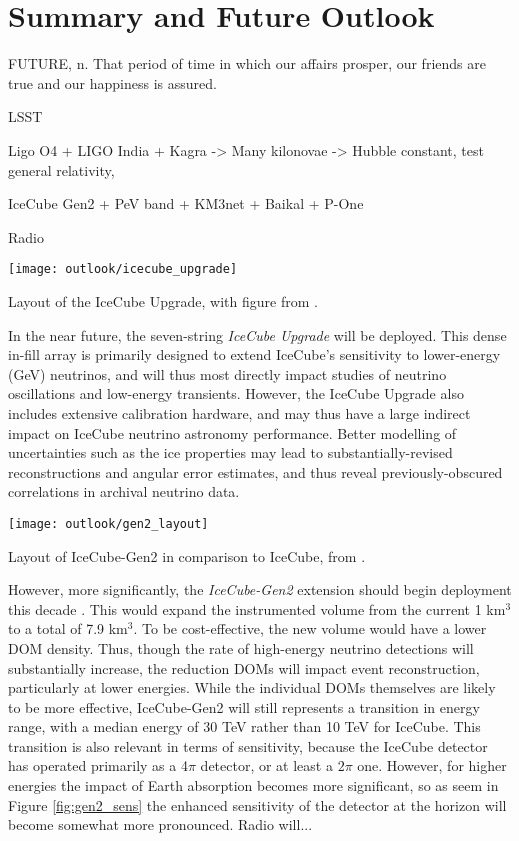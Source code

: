 \setchapterpreamble[u]{\margintoc}
\chapter{Summary and Future Outlook}
\begin{fquote} FUTURE, n. That period of time in which our affairs prosper, our friends are true and our happiness is assured.  
\end{fquote}

LSST

Ligo O4 + LIGO India + Kagra -> Many kilonovae -> Hubble constant, test general relativity, 

IceCube Gen2 + PeV band + KM3net + Baikal + P-One

Radio


\begin{marginfigure}
	\centering \texttt{[image: outlook/icecube\_upgrade]}
	\caption{Layout of the IceCube Upgrade, with figure from \cite{ic_upgrade}.}
	\label{fig:upgrade}
\end{marginfigure}

In the near future, the seven-string \emph{IceCube Upgrade} will be deployed. This dense in-fill array is primarily designed to extend IceCube's sensitivity to lower-energy (GeV) neutrinos, and will thus most directly impact studies of neutrino oscillations and low-energy transients. However, the IceCube Upgrade also includes extensive calibration hardware, and may thus have a large indirect impact on IceCube neutrino astronomy performance. Better modelling of uncertainties such as the ice properties may lead to substantially-revised reconstructions and angular error estimates, and thus reveal previously-obscured correlations in archival neutrino data.

\begin{marginfigure}
	\centering \texttt{[image: outlook/gen2\_layout]}
	\caption{Layout of IceCube-Gen2 in comparison to IceCube, from \cite{gen2_icrc}.}
	\label{fig:gen2_layout}
\end{marginfigure}

However, more significantly, the \emph{IceCube-Gen2} extension should begin deployment this decade \cite{gen2_icrc}. This would expand the instrumented volume from the current 1 km$^{3}$ to a total of 7.9 km$^{3}$. To be cost-effective, the new volume would have a lower DOM density. Thus, though the rate of high-energy neutrino detections will substantially increase, the reduction DOMs will impact event reconstruction, particularly at lower energies. While the individual DOMs themselves are likely to be more effective, IceCube-Gen2 will still represents a transition in energy range, with a median energy of 30 TeV rather than  10 TeV for IceCube. This transition is also relevant in terms of sensitivity, because the IceCube detector has operated primarily as a 4$\pi$ detector, or at least a $2 \pi$ one. However, for higher energies the impact of Earth absorption becomes more significant, so as seem in Figure \ref{fig:gen2_sens} the enhanced sensitivity of the detector at the horizon will become somewhat more pronounced.  Radio will...

